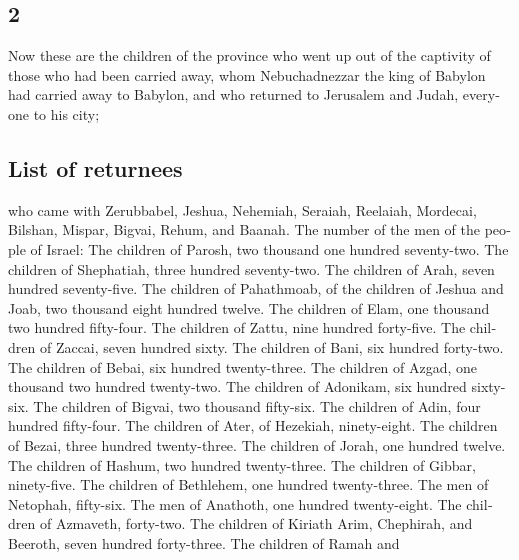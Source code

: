\begin{paracol}{2}
\begin{otherlanguage}{english}
\hypertarget{section-3}{%
\section{2}\label{section-3}}

 Now these are the children of the province who went up
out of the captivity of those who had been carried away, whom
Nebuchadnezzar the king of Babylon had carried away to Babylon, and who
returned to Jerusalem and Judah, everyone to his city;

\hypertarget{list-of-returnees}{%
\subsection{List of returnees}\label{list-of-returnees}}

 who came with Zerubbabel, Jeshua, Nehemiah, Seraiah,
Reelaiah, Mordecai, Bilshan, Mispar, Bigvai, Rehum, and Baanah. The
number of the men of the people of Israel:  The children
of Parosh, two thousand one hundred seventy-two.  The
children of Shephatiah, three hundred seventy-two.  The
children of Arah, seven hundred seventy-five.  The
children of Pahathmoab, of the children of Jeshua and Joab, two thousand
eight hundred twelve.  The children of Elam, one thousand
two hundred fifty-four.  The children of Zattu, nine
hundred forty-five.  The children of Zaccai, seven hundred
sixty.  The children of Bani, six hundred forty-two.
 The children of Bebai, six hundred twenty-three.
 The children of Azgad, one thousand two hundred
twenty-two.  The children of Adonikam, six hundred
sixty-six.  The children of Bigvai, two thousand
fifty-six.  The children of Adin, four hundred
fifty-four.  The children of Ater, of Hezekiah,
ninety-eight.  The children of Bezai, three hundred
twenty-three.  The children of Jorah, one hundred twelve.
 The children of Hashum, two hundred twenty-three.
 The children of Gibbar, ninety-five.  The
children of Bethlehem, one hundred twenty-three.  The men
of Netophah, fifty-six.  The men of Anathoth, one hundred
twenty-eight.  The children of Azmaveth, forty-two.
 The children of Kiriath Arim, Chephirah, and Beeroth,
seven hundred forty-three.  The children of Ramah and

\end{otherlanguage}
\end{paracol}
